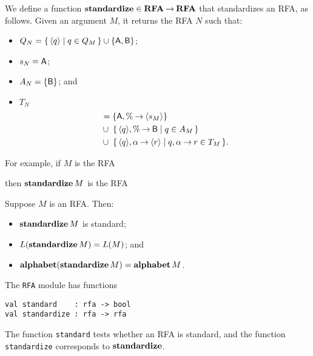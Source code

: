 %
We define a function $\mathbf{standardize}\in\mathbf{RFA}\mathbin{\to}\mathbf{RFA}$ that standardizes
an RFA, as follows.  Given an argument $M$, it returns the RFA $N$
such that:
\begin{itemize}
\item $Q_N = \{ \, \langle q\rangle \mid q\in Q_M \, \}\cup\{\mathsf{A},\mathsf{B}\}$;

\item $s_N = \mathsf{A}$;

\item $A_N = \{\mathsf{B}\}$; and

\item $T_N$
  \begin{align*}
    &= \{\Asf,\%\fun\langle s_M\rangle\} \\
    &\cup \;\setof{\langle q\rangle,\%\fun\Bsf}{q\in A_M} \\
    &\cup \;\setof{\langle q\rangle,\alpha\fun\langle r\rangle}%
            {q,\alpha\fun r\in T_M}.
  \end{align*}
\end{itemize}

For example, if $M$ is the RFA
\begin{center}
  
\end{center}
then $\mathbf{standardize}\,M$ is the RFA
\begin{center}
  
\end{center}

\begin{proposition}
Suppose $M$ is an RFA.  Then:
\begin{itemize}
\item $\mathbf{standardize}\,M$ is standard;

\item $L(\mathbf{standardize}\,M) = L(M)$; and

\item $\mathbf{alphabet}(\mathbf{standardize}\,M) = \mathbf{alphabet}\,M$.
\end{itemize}
\end{proposition}

The \texttt{RFA} module has functions
\begin{verbatim}
val standard    : rfa -> bool
val standardize : rfa -> rfa
\end{verbatim}
%
%
The function \texttt{standard} tests whether an RFA is standard,
and the function \texttt{standardize} corresponds to
$\mathbf{standardize}$.

